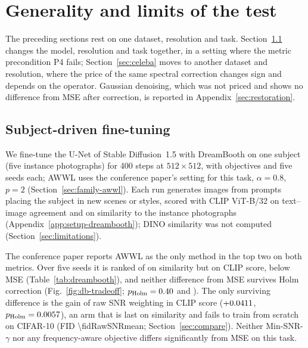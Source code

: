 \section{Generality and limits of the test}
\label{sec:generality}

The preceding sections rest on one dataset, resolution and task.
Section~\ref{sec:dreambooth} changes the model, resolution and task together,
in a setting where the metric precondition P4 fails;
Section~\ref{sec:celeba} moves to another dataset and resolution, where the
price of the same spectral correction changes sign and depends on the
operator. Gaussian denoising, which was not priced and shows no difference
from MSE after correction, is reported in Appendix~\ref{sec:restoration}.

\subsection{Subject-driven fine-tuning}
\label{sec:dreambooth}

We fine-tune the U-Net of Stable Diffusion~1.5 \citep{rombach2022high} with
DreamBooth \citep{ruiz2023dreambooth} on one subject (five instance
photographs) for 400 steps at $512\times512$, with \dbNobjectives{}
objectives and five seeds each; AWWL uses the conference paper's setting for
this task, $\alpha = 0.8$, $p = 2$ (Section~\ref{sec:family-awwl}). Each run
generates \dbNimages{} images from \dbNprompts{} prompts placing the subject
in new scenes or styles, scored with CLIP ViT-B/32
\citep{radford2021learning} on text--image agreement and on similarity to the
instance photographs (Appendix~\ref{app:setup-dreambooth}); DINO similarity
\citep{caron2021emerging} was not computed (Section~\ref{sec:limitations}).


The conference paper \citep{thao2026awwl} reports AWWL as the only method in
the top two on both metrics. Over five seeds it is ranked \dbRankSimAWWL{} of
\dbNobjectives{} on similarity but \dbRankClipAWWL{} on CLIP score, below MSE
(Table~\ref{tab:dreambooth}), and neither difference from MSE survives Holm
correction (Fig.~\ref{fig:db-tradeoff}; $p_{\mathrm{Holm}} = 0.40$
and \dbDClipAWWLHolm). The only surviving difference is the gain of raw SNR
weighting in CLIP score ($+0.0411$,
$p_{\mathrm{Holm}} = 0.0057$), an arm that is last on similarity
and fails to train from scratch on CIFAR-10 (FID
\num[round-mode=places,round-precision=0]{\fidRawSNRmean};
Section~\ref{sec:compare}). Neither Min-SNR-$\gamma$ nor any
frequency-aware objective differs significantly from MSE on this task.

